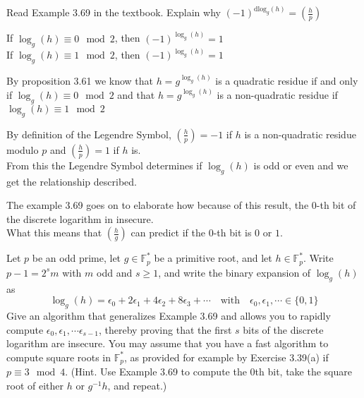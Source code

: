 \documentclass[12pt]{article}
\begin{document}
\problem Read Example 3.69 in the textbook. Explain why $(-1)^{\text{dlog}_g(h)}=\left(\frac{h}{p}\right)$

\solution
If $\log_g(h)\equiv 0\mod{2}$, then $(-1)^{\log_g(h)}=1$\\
If $\log_g(h)\equiv 1\mod{2}$, then $(-1)^{\log_g(h)}=1$

\noindent
By proposition 3.61 we know that $h=g^{\log_g(h)}$ is a quadratic residue if and only if $\log_g(h)\equiv 0\mod{2}$ and that $h=g^{\log_g(h)}$ is a non-quadratic residue if $\log_g(h)\equiv1\mod{2}$

\noindent
By definition of the Legendre Symbol, $\left(\frac{h}{p}\right)=-1$ if $h$ is a non-quadratic residue modulo $p$ and $\left(\frac{h}{p}\right)=1$ if $h$ is.\\
From this the Legendre Symbol determines if $\log_g(h)$ is odd or even and we get the relationship described.

\noindent
The example 3.69 goes on to elaborate how because of this result, the $0$-th bit of the discrete logarithm in insecure.\\
What this means that $\left(\frac{h}{g}\right)$ can predict if the $0$-th bit is $0$ or $1$.

\newpage
\problem Let $p$ be an odd prime, let $g\in\mathbb{F}_p^*$ be a primitive root, and let $h\in\mathbb{F}_p^*$. Write $p-1=2^sm$ with $m$ odd and $s\geq 1$, and write the binary expansion of $\log_g(h)$ as
\[\log_g(h)=\epsilon_0+2\epsilon_1+4\epsilon_2+8\epsilon_3+\cdots\quad\text{with}\quad\epsilon_0,\epsilon_1,\cdots\in\{0,1\}\]
Give an algorithm that generalizes Example 3.69 and allows you to rapidly compute $\epsilon_0,\epsilon_1,\cdots\epsilon_{s-1}$, thereby proving that the first $s$ bits of the discrete logarithm are insecure. You may assume that you have a fast algorithm to compute square roots in $\mathbb{F}_p^*$, as provided for example by Exercise 3.39(a) if $p\equiv3\mod{4}$. (Hint. Use Example 3.69 to compute the 0th bit, take the square root of either $h$ or $g^{-1}h$, and repeat.)
\end{document}
